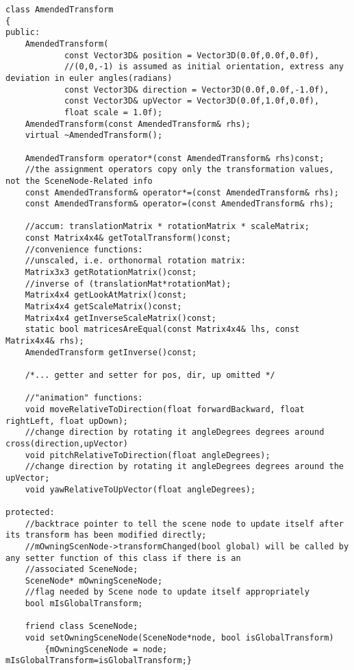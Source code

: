  	
 	\begin{lstlisting}[caption={AmenededTransform Klassendefinition, gekürzt},label=listing:AmendedTransformDef]
class AmendedTransform
{
public:
	AmendedTransform(
			const Vector3D& position = Vector3D(0.0f,0.0f,0.0f),
			//(0,0,-1) is assumed as initial orientation, extress any deviation in euler angles(radians)
			const Vector3D& direction = Vector3D(0.0f,0.0f,-1.0f),
			const Vector3D& upVector = Vector3D(0.0f,1.0f,0.0f),
			float scale = 1.0f);
	AmendedTransform(const AmendedTransform& rhs);
	virtual ~AmendedTransform();

	AmendedTransform operator*(const AmendedTransform& rhs)const;
	//the assignment operators copy only the transformation values, not the SceneNode-Related info
	const AmendedTransform& operator*=(const AmendedTransform& rhs);
	const AmendedTransform& operator=(const AmendedTransform& rhs);

	//accum: translationMatrix * rotationMatrix * scaleMatrix;
	const Matrix4x4& getTotalTransform()const;
	//convenience functions:
	//unscaled, i.e. orthonormal rotation matrix:
	Matrix3x3 getRotationMatrix()const;
	//inverse of (translationMat*rotationMat);
	Matrix4x4 getLookAtMatrix()const;
	Matrix4x4 getScaleMatrix()const;
	Matrix4x4 getInverseScaleMatrix()const;
	static bool matricesAreEqual(const Matrix4x4& lhs, const Matrix4x4& rhs);
	AmendedTransform getInverse()const;

	/*... getter and setter for pos, dir, up omitted */ 

	//"animation" functions:
	void moveRelativeToDirection(float forwardBackward, float rightLeft, float upDown);
	//change direction by rotating it angleDegrees degrees around cross(direction,upVector)
	void pitchRelativeToDirection(float angleDegrees);
	//change direction by rotating it angleDegrees degrees around the upVector;
	void yawRelativeToUpVector(float angleDegrees);

protected:
	//backtrace pointer to tell the scene node to update itself after its transform has been modified directly;
	//mOwningScenNode->transformChanged(bool global) will be called by any setter function of this class if there is an
	//associated SceneNode;
	SceneNode* mOwningSceneNode;
	//flag needed by Scene node to update itself appropriately
	bool mIsGlobalTransform;
	
	friend class SceneNode;
	void setOwningSceneNode(SceneNode*node, bool isGlobalTransform)
		{mOwningSceneNode = node; mIsGlobalTransform=isGlobalTransform;}



\end{lstlisting}

